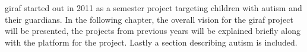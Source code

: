 \ac{giraf} started out in 2011 as a semester project targeting children with autism and their guardians. %
 In the following chapter, the overall vision for the \ac{giraf} project will be presented, the projects from previous years will be explained briefly along with the platform for the project. Lastly a section describing autism is included.

